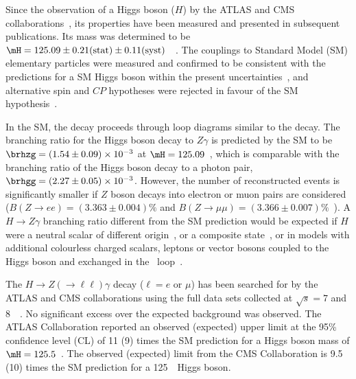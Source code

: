 Since the observation of a Higgs boson ($H$) by the ATLAS and CMS 
collaborations~\cite{atlas-higgs, cms-higgs}, its properties have been measured and
presented in subsequent publications. Its mass was determined
to be $\mH = 125.09 \pm 0.21\mathrm{(stat)} \pm 0.11\mathrm{(syst)}$~\GeV~\cite{higgs-mass}.
The couplings to Standard Model (SM) elementary particles were measured and confirmed to be consistent with 
the predictions for a SM Higgs boson within the present 
uncertainties~\cite{atlas-couplings,cms-couplings,atlas-cms-combined}, 
and alternative spin and $CP$ hypotheses were rejected in favour of the SM 
hypothesis~\cite{atlas-spin,Aad:2015mxa,cms-spin,cms-higgsprop}. 

In the SM, the \Zg decay proceeds through loop diagrams similar to the \htogg decay. 
The branching ratio for
the Higgs boson decay to $Z\gamma$ is predicted by the SM to be $\brhzg = (1.54\pm0.09)\times 10^{-3}$ at $\mH = 125.09$~\GeV,
which is
comparable with the branching ratio of the Higgs boson decay to a photon pair, $\brhgg = (2.27 \pm 0.05)\times 10^{-3}$. However, the number of reconstructed events is significantly smaller if 
$Z$ boson
decays into electron or muon pairs are considered ($B(Z\to ee)=(3.363\pm 0.004)\%$
and $B(Z\to\mu\mu)=(3.366\pm 0.007)\%$~\cite{Olive:2016xmw}).
A $H\to Z\gamma$ branching ratio different from the SM prediction would be expected if $H$ were
a neutral scalar of different
origin~\cite{low, low2}, or a composite state~\cite{azatov}, or in
models with additional colourless charged scalars, leptons or
vector bosons coupled to the Higgs boson and exchanged in the
\htoZg~loop~\cite{extensions, Chen:2013vi, carena}.

The $H\to Z(\to\ell\ell)\gamma$ decay ($\ell= e$ or $\mu$) 
has been searched for by the ATLAS and CMS
collaborations using the full data sets collected at $\sqrt{s}=7$ and 
8~\TeV~\cite{atlas-lowmass,cms-lowmass}. 
No significant excess over the expected background was observed. 
The ATLAS Collaboration reported an observed (expected) upper limit at the 95\% 
confidence level (CL) of 11 (9) times the SM prediction for a Higgs boson mass of 
$\mH = 125.5$~\GeV. 
The observed (expected) limit from the 
CMS Collaboration is 9.5 (10) times the SM prediction for a 125~\GeV\ Higgs boson.

